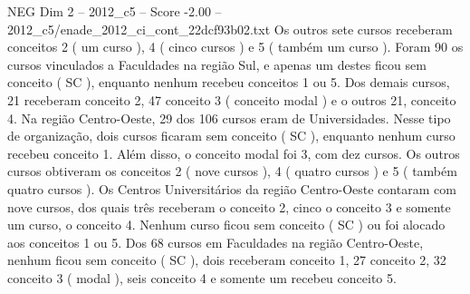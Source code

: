 \begin{textsample}{NEG Dim 2 – 2012\_c5 – Score -2.00 – 2012\_c5/enade\_2012\_ci\_cont\_22dcf93b02.txt}
Os outros sete cursos receberam conceitos 2 ( um curso ), 4 ( cinco cursos ) e 5 ( também um curso ).
Foram 90 os cursos vinculados a Faculdades na região Sul, e apenas um destes ficou sem conceito ( SC ), enquanto nenhum recebeu conceitos 1 ou 5.
Dos demais cursos, 21 receberam conceito 2, 47 conceito 3 ( conceito modal ) e o outros 21, conceito 4.
Na região Centro-Oeste, 29 dos 106 cursos eram de Universidades.
Nesse tipo de organização, dois cursos ficaram sem conceito ( SC ), enquanto nenhum curso recebeu conceito 1.
Além disso, o conceito modal foi 3, com dez cursos.
Os outros cursos obtiveram os conceitos 2 ( nove cursos ), 4 ( quatro cursos ) e 5 ( também quatro cursos ).
Os Centros Universitários da região Centro-Oeste contaram com nove cursos, dos quais três receberam o conceito 2, cinco o conceito 3 e somente um curso, o conceito 4.
Nenhum curso ficou sem conceito ( SC ) ou foi alocado aos conceitos 1 ou 5.
Dos 68 cursos em Faculdades na região Centro-Oeste, nenhum ficou sem conceito ( SC ), dois receberam conceito 1, 27 conceito 2, 32 conceito 3 ( modal ), seis conceito 4 e somente um recebeu conceito 5.

\end{textsample}
